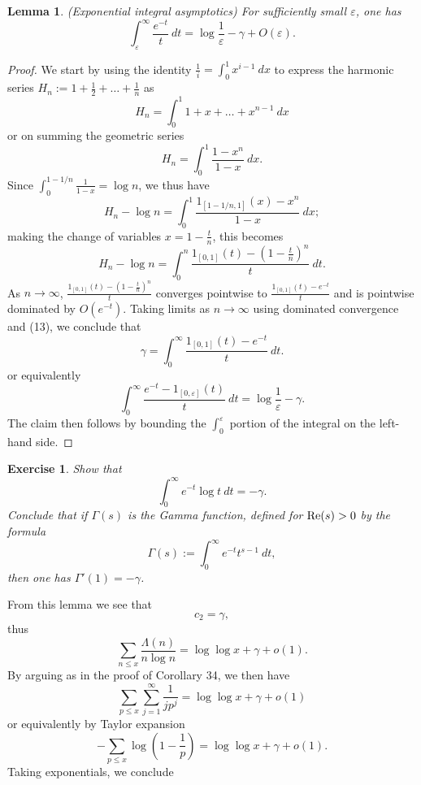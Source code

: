 \documentclass[10pt,reqno]{amsart}
\newtheorem{lemma}[theorem]{Lemma}
\newtheorem{exercise}[theorem]{Exercise}
\begin{document}
\begin{lemma} (Exponential integral asymptotics) For sufficiently small $\varepsilon$, one has
%
\[  \int_\varepsilon^\infty \frac{e^{-t}}{t}\ dt = \log \frac{1}{\varepsilon} - \gamma + O(\varepsilon).\]
\end{lemma}
\begin{proof}
    We start by using the identity $\frac{1}{i} = \int_0^1 x^{i-1}\ dx$ to express the harmonic series $H_n := 1+\frac{1}{2}+\ldots+\frac{1}{n}$ as
    \[  H_n = \int_0^1 1 + x + \ldots + x^{n-1}\ dx\]
    or on summing the geometric series
    \[  H_n = \int_0^1 \frac{1-x^n}{1-x}\ dx.\]
    Since $\int_0^{1-1/n} \frac{1}{1-x} = \log n$, we thus have
    \[  H_n - \log n = \int_0^1 \frac{1_{[1-1/n,1]}(x) - x^n}{1-x}\ dx;\]
    making the change of variables $x = 1-\frac{t}{n}$, this becomes
    \[  H_n - \log n = \int_0^n \frac{1_{[0,1]}(t) - (1-\frac{t}{n})^n}{t}\ dt.\]
    As $n \rightarrow \infty$, $\frac{1_{[0,1]}(t) - (1-\frac{t}{n})^n}{t}$ converges pointwise to $\frac{1_{[0,1]}(t) - e^{-t}}{t}$ and is pointwise dominated by $O( e^{-t} )$. Taking limits as $n \rightarrow \infty$ using dominated convergence and (13), we conclude that
    \[  \gamma = \int_0^\infty \frac{1_{[0,1]}(t) - e^{-t}}{t}\ dt.\]
    or equivalently
    \[  \int_0^\infty \frac{e^{-t} - 1_{[0,\varepsilon]}(t)}{t}\ dt = \log \frac{1}{\varepsilon} - \gamma.\]
    The claim then follows by bounding the $\int_0^\varepsilon$ portion of the integral on the left-hand side. %
\end{proof}

\begin{exercise}
    Show that
    \[  \int_0^\infty e^{-t} \log t\ dt = -\gamma.\]
    Conclude that if $\Gamma(s)$ is the \emph{Gamma function}, defined for $\hbox{Re}(s)>0$ by the formula
    \[  \Gamma(s) := \int_0^\infty e^{-t} t^{s-1}\ dt,\]
    then one has $\Gamma'(1)=-\gamma$.
\end{exercise}

From this lemma we see that
%
\begin{equation}   c_2 = \gamma, \end{equation}
%
thus
%
\[  \sum_{n \leq x} \frac{\Lambda(n)}{n \log n} = \log\log x + \gamma + o(1).\]
%
By arguing as in the proof of Corollary 34, we then have
%
\[  \sum_{p \leq x} \sum_{j=1}^\infty \frac{1}{j p^j} = \log\log x + \gamma + o(1)\]
%
or equivalently by Taylor expansion
%
\[  - \sum_{p \leq x} \log(1-\frac{1}{p}) = \log\log x + \gamma + o(1).\]
%
Taking exponentials, we conclude
\end{document}
